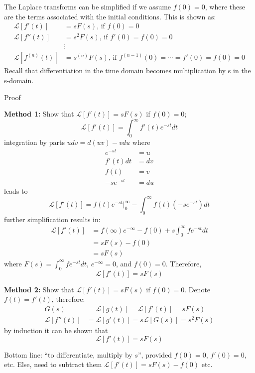 \documentclass[12pt,letter]{article}
\numberwithin{ex}{section} %
\numberwithin{re}{section} %
\newcommand{\gr}[1]{\textcolor[rgb]{0.00,0.50,0.00}{#1}}
\newcommand{\Laplace}[1]{\ensuremath{\mathcal{L}{\left[#1\right]}}}
\numberwithin{equation}{section}	%
\begin{document}
The Laplace transforms can be simplified if we assume $ f(0) = 0$, where these are the terms associated with the initial conditions. This is shown as:
\begin{align}
\Laplace{f'(t)} &= sF(s) \text{, if } f(0) = 0   \\
\Laplace{f''(t)} &= s^2F(s) \text{, if } f'(0) = f(0) = 0  \nonumber \\
&\vdots  \nonumber \\
\Laplace{f^{(n)}(t)} &= s^{(n)}F(s) \text{, if } f^{(n-1)}(0) = \cdots = f'(0) = f(0) = 0 \nonumber  
\end{align}
Recall that differentiation in the time domain becomes multiplication by s in the s-domain.


\begin{mdframed}[middlelinewidth=0.5mm]
\begin{center}
\gr{Proof}
\end{center}

\noindent \textbf{Method 1:}
Show that $\Laplace{f'(t)} = s F(s)$ if $f(0) = 0$;
\begin{equation}
\Laplace{f'(t)} = \int_{0}^{\infty} f'(t)e^{-st}dt 
\end{equation}
integration by parts $udv = d(uv) -vdu$ where
\begin{align}
e^{-st} &= u   \\
f'(t)dt &= dv  \nonumber \\
f(t) &= v  \nonumber \\
-se^{-st} &= du   \nonumber
\end{align}
leads to
\begin{equation}
\Laplace{f'(t)} = f(t)e^{-st}\big|_{0}^{\infty} - \int_{0}^{\infty}f(t)(-se^{-st})dt
\end{equation}
further simplification results in:
\begin{align}
\Laplace{f'(t)} &= f(\infty)e^{- \infty} - f(0) + s \int_{0}^{\infty} f e^{-s t} dt   \\
 &= s F(s) -f(0)  \nonumber \\
 &= s F(s)  \nonumber
\end{align}
where $F(s) = \int_{0}^{\infty} f e^{-s t} dt$, $e^{- \infty}=0$, and $f(0) = 0$. Therefore, 
\begin{equation}
\Laplace{f'(t)} = s F(s)
\end{equation}

\noindent \textbf{Method 2:}
Show that $\Laplace{f'(t)} = s F(s)$ if $f(0) = 0$. Denote $f(t) = f'(t)$, therefore:
\begin{align}
G(s) &= \Laplace{g(t)} = \Laplace{f'(t)} = sF(s)  \\
\Laplace{f''(t)} &= \Laplace{g'(t)} = s\Laplace{G(s)} = s^2F(s)  \nonumber
\end{align}
by induction it can be shown that 
\begin{equation}
\Laplace{f'(t)} = s F(s)
\end{equation}

Bottom line: ``to differentiate, multiply by $s$'', provided $f(0) =0$, $f'(0) =0$, etc. Else, need to subtract them $\Laplace{f'(t)} = sF(s) -f(0)$ etc. 
\end{mdframed}
\end{document}
